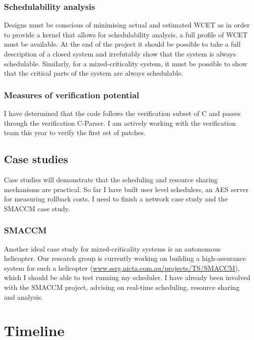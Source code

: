 \subsubsection{Schedulability analysis}

Designs must be conscious of minimising actual and estimated \gls{WCET} as in order to provide a kernel that allows for schedulability analysis, a full profile of \gls{WCET} must be available.
At the end of the project it should be possible to take a full description of a closed system and irrefutably show that the system is always schedulable.
Similarly, for a mixed-criticality system, it must be possible to show that the critical parts of the system are always schedulable.

\subsubsection{Measures of verification potential}

I have determined that the code follows the verification subset of C and passes through the verification C-Parser.
I am actively working with the verification team this year to verify the first set of patches. 

\subsection{Case studies}

Case studies will demonstrate that the scheduling and resource sharing mechanisms are practical.
So far I have built user level schedulers, an AES server for measuring rollback costs. 
I need to finish a network case study and the SMACCM case study. 

\subsubsection{SMACCM}

Another ideal case study for mixed-criticality systems is an autonomous helicopter.
Our research group is currently working on building a high-assurance system for such a helicopter (\url{www.ssrg.nicta.com.au/projects/TS/SMACCM}), which I should be able to test running my scheduler.
I have already been involved with the SMACCM project, advising on real-time scheduling, resource sharing and analysis.

\section{Timeline}

